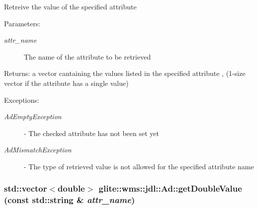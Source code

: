 Retreive the value of the specified attribute \begin{Desc}
\item[Parameters:]
\begin{description}
\item[{\em attr\_\-name}]The name of the attribute to be retrieved \end{description}
\end{Desc}
\begin{Desc}
\item[Returns:]a vector cantaining the values listed in the specified attribute , (1-size vector if the attribute has a single value) \end{Desc}
\begin{Desc}
\item[Exceptions:]
\begin{description}
\item[{\em Ad\-Empty\-Exception}]- The checked attribute has not been set yet \item[{\em Ad\-Mismatch\-Exception}]- The type of retrieved value is not allowed for the specified attribute name \end{description}
\end{Desc}
\hypertarget{classglite_1_1wms_1_1jdl_1_1Ad_z19_18}{
\subsubsection[getDoubleValue]{\setlength{\rightskip}{0pt plus 5cm}std::vector$<$double$>$ glite::wms::jdl::Ad::get\-Double\-Value (const std::string \& {\em attr\_\-name})}}
\label{classglite_1_1wms_1_1jdl_1_1Ad_z19_18}


